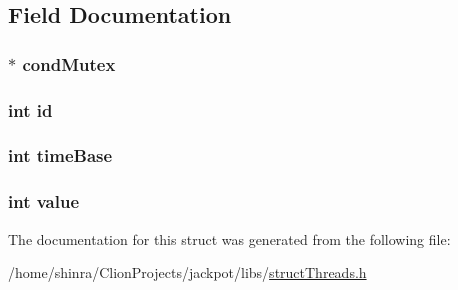 \subsection{Field Documentation}
\hypertarget{structwheel__t_a24715ed40b477ab5d0426f24cb9e4514}{
\subsubsection[{cond\+Mutex}]{$\ast$ cond\+Mutex}}\label{structwheel__t_a24715ed40b477ab5d0426f24cb9e4514}
\hypertarget{structwheel__t_a7441ef0865bcb3db9b8064dd7375c1ea}{
\subsubsection[{id}]{\setlength{\rightskip}{0pt plus 5cm}int id}}\label{structwheel__t_a7441ef0865bcb3db9b8064dd7375c1ea}
\hypertarget{structwheel__t_a782adf457267a648e01dbf13d8a16181}{
\subsubsection[{time\+Base}]{\setlength{\rightskip}{0pt plus 5cm}int time\+Base}}\label{structwheel__t_a782adf457267a648e01dbf13d8a16181}
\hypertarget{structwheel__t_ac4f474c82e82cbb89ca7c36dd52be0ed}{
\subsubsection[{value}]{\setlength{\rightskip}{0pt plus 5cm}int value}}\label{structwheel__t_ac4f474c82e82cbb89ca7c36dd52be0ed}


The documentation for this struct was generated from the following file\+:\begin{DoxyCompactItemize}
\item 
/home/shinra/\+Clion\+Projects/jackpot/libs/\hyperlink{struct_threads_8h}{struct\+Threads.\+h}\end{DoxyCompactItemize}
